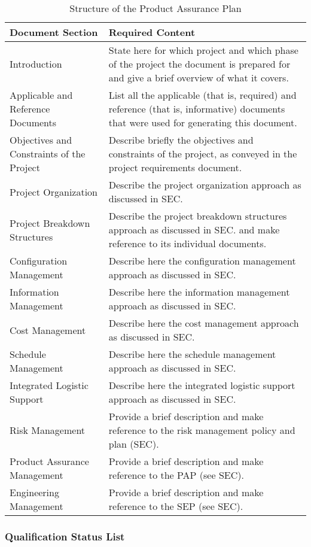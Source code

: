 \begin{table}[h]
\centering
\begin{tabular}{l p{7cm}}
\toprule
\textbf{Document Section} & \textbf{Required Content} \\
\midrule
Introduction & State here for which project and which phase of the project the document is prepared for and give a brief overview of what it covers. \\
Applicable and Reference Documents & List all the applicable (that is, required) and reference (that is, informative) documents that were used for generating this document. \\
Objectives and Constraints of the Project & Describe briefly the objectives and constraints of the project, as conveyed in the project requirements document. \\
Project Organization & Describe the project organization approach as discussed in SEC. \\
Project Breakdown Structures & Describe the project breakdown structures approach as discussed in SEC. and make reference to its individual documents. \\
Configuration Management & Describe here the configuration management approach as discussed in SEC.\\
Information Management & Describe here the information management approach as discussed in SEC.\\
Cost Management & Describe here the cost management approach as discussed in SEC.\\
Schedule Management & Describe here the schedule management approach as discussed in SEC.\\
Integrated Logistic Support & Describe here the integrated logistic support approach as discussed in SEC. \\
Risk Management & Provide a brief description and make reference to the risk management policy and plan (SEC). \\
Product Assurance Management & Provide a brief description and make reference to the PAP (see SEC). \\
Engineering Management & Provide a brief description and make reference to the SEP (see SEC). \\
\bottomrule
\end{tabular}
\caption{Structure of the Product Assurance Plan}
\end{table}

\clearpage
\subsubsection{Qualification Status List}
\label{app:Qualification Status List}


